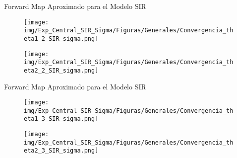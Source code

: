 \documentclass[10pt,aspectratio=169]{beamer}
\begin{document}
\begin{frame}{Forward Map Aproximado para el Modelo SIR}
  \begin{figure}[H] 
    \centering 
    \texttt{[image: img/Exp\_Central\_SIR\_Sigma/Figuras/Generales/Convergencia\_theta1\_2\_SIR\_sigma.png]} 
  \end{figure} 
  \begin{figure}[H] 
    \centering 
    \texttt{[image: img/Exp\_Central\_SIR\_Sigma/Figuras/Generales/Convergencia\_theta2\_2\_SIR\_sigma.png]} 
    \label{Fig. Aprox SIR 5v} 
  \end{figure} 
\end{frame}

\begin{frame}{Forward Map Aproximado para el Modelo SIR}
  \begin{figure}[H] 
    \centering 
    \texttt{[image: img/Exp\_Central\_SIR\_Sigma/Figuras/Generales/Convergencia\_theta1\_3\_SIR\_sigma.png]} 
  \end{figure} 
  \begin{figure}[H] 
    \centering 
    \texttt{[image: img/Exp\_Central\_SIR\_Sigma/Figuras/Generales/Convergencia\_theta2\_3\_SIR\_sigma.png]} 
    \label{Fig. Aprox SIR 8v}
  \end{figure} 
\end{frame}
\end{document}

